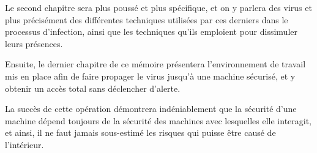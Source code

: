 Le second chapitre sera plus poussé et plus spécifique, et on y parlera des virus et plus précisément
des différentes techniques utilisées par ces derniers dans le processus d'infection, ainsi que les 
techniques qu'ils emploient pour dissimuler leurs présences. 


Ensuite, le dernier chapitre de ce mémoire présentera l'environnement de travail mis en place afin de faire 
propager le virus jusqu'à une machine sécurisé, et y obtenir un accès total sans déclencher d'alerte.

La succès de cette opération démontrera indéniablement que la sécurité d'une machine dépend toujours
de la sécurité des machines avec lesquelles elle interagit, et ainsi, il ne faut jamais sous-estimé les risques qui puisse être causé de l'intérieur.


